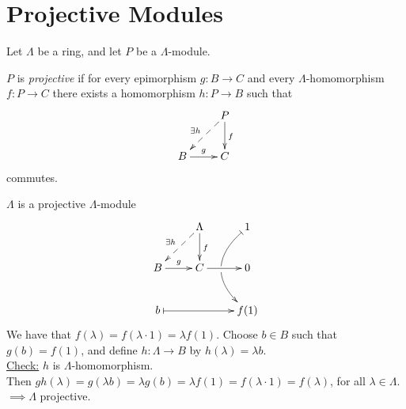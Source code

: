 \section{Projective Modules}
Let $\Lambda$ be a ring, and let $P$ be a $\Lambda$-module. 
\begin{defin}
$P$ is \emph{projective} if for every epimorphism $g: B \to C$ and every  $\Lambda$-homomorphism $f: P \to C$ there exists a homomorphism $h: P \to B$ such that
$$\xymatrix{
& P\ar[d]^f \ar@{-->}[ld]_{\exists h}\\
B \ar[r]^g & C
}$$ commutes.
\end{defin}

\begin{exam}
$\Lambda$ is a projective $\Lambda$-module
$$\xymatrix{
& \Lambda\ar[d]^f \ar@{-->}[ld]_{\exists h} & 1\ar@/_2pc/@{|->}[dd]|\hole\\
B \ar[r]^g & C \ar[r] & 0\\
b\ar@{|->}[rr] && f(1)
}$$
We have that $f(\lambda) = f(\lambda \cdot 1) = \lambda f(1)$. Choose
$b \in B$ such that $g(b) = f(1)$, and define $h: \Lambda \to B$ by  $h(\lambda) = \lambda b$.\\
\underline{Check:} $h$ is $\Lambda$-homomorphism.\\
Then $gh(\lambda) = g(\lambda b) = \lambda g(b) = \lambda f(1) =
f(\lambda \cdot 1) = f(\lambda)$, for all $\lambda \in \Lambda$.\\
$\implies \Lambda$ projective.
\end{exam}

